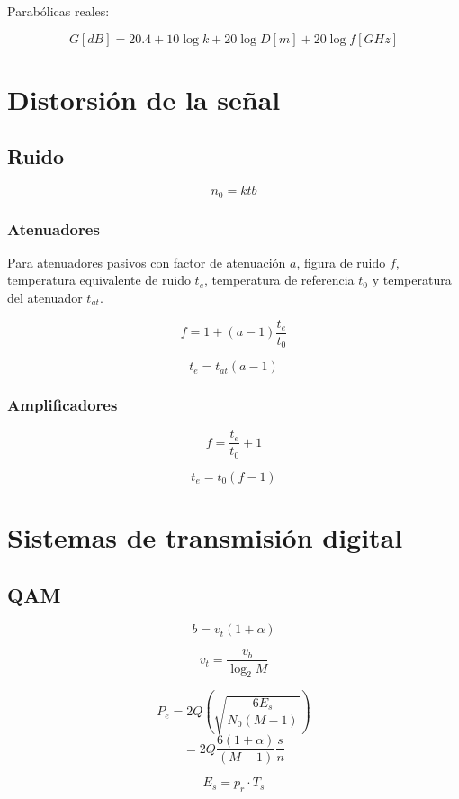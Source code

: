 \documentclass[12pt,a4paper]{article}
\begin{document}
Parabólicas reales:

\[ G [dB] = 20.4 + 10 \log{k} + 20 \log{D[m]} + 20 \log{f[GHz]} \]


\section{Distorsión de la señal}
\label{distorsion_de_la_senal}

\subsection{Ruido}
\label{sub:ruido}

\[ n_0 = k t b \]

\subsubsection{Atenuadores}
\label{ssub:atenuadores}

Para atenuadores pasivos con factor de atenuación $ a $, figura de ruido $ f $,
temperatura equivalente de ruido $ t_e $, temperatura de referencia $ t_0 $ y
temperatura del atenuador $ t_{at} $.

\[ f = 1 + (a-1) \frac{t_e}{t_0} \]

\[ t_e = t_{at} (a -1) \]

\subsubsection{Amplificadores}
\label{ssub:amplificadores}

\[ f = \frac{t_e}{t_0} +1 \]

\[ t_e = t_0 (f - 1) \]

\section{Sistemas de transmisión digital}
\label{sistemas_de_transmision_digital}

\subsection{QAM}
\label{sub:qam}

\[ b = v_t (1+\alpha) \]

\[ v_t = \frac{v_b}{\log_2 M} \]

\[ P_e = 2Q \left( \sqrt{\frac{6 E_s}{N_0 (M-1)}} \right) \]
\[ = 2Q \frac{6 (1 + \alpha)}{(M-1)} \frac{s}{n} \]

\[ E_s = p_r \cdot T_s \]
\end{document}
